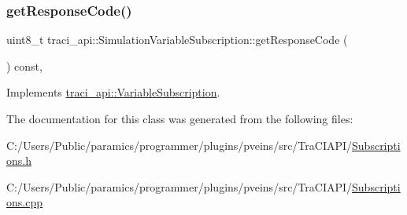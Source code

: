 \subsubsection{\texorpdfstring{get\+Response\+Code()}{getResponseCode()}}
{\footnotesize\ttfamily uint8\+\_\+t traci\+\_\+api\+::\+Simulation\+Variable\+Subscription\+::get\+Response\+Code (\begin{DoxyParamCaption}{ }\end{DoxyParamCaption}) const\hspace{0.3cm}{\ttfamily [override]}, {\ttfamily [virtual]}}



Implements \hyperlink{classtraci__api_1_1_variable_subscription_a3e852072c435d02f96ff91f81506cef9}{traci\+\_\+api\+::\+Variable\+Subscription}.



The documentation for this class was generated from the following files\+:\begin{DoxyCompactItemize}
\item 
C\+:/\+Users/\+Public/paramics/programmer/plugins/pveins/src/\+Tra\+C\+I\+A\+P\+I/\hyperlink{_subscriptions_8h}{Subscriptions.\+h}\item 
C\+:/\+Users/\+Public/paramics/programmer/plugins/pveins/src/\+Tra\+C\+I\+A\+P\+I/\hyperlink{_subscriptions_8cpp}{Subscriptions.\+cpp}\end{DoxyCompactItemize}
